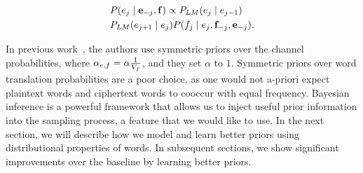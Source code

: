 
\begin{align} \label{prob_sampling_plaintext}
&P( e_j \mid \mathbf{e}_{-j}, \mathbf{f} ) \propto  P_{LM}(e_j \mid e_{j-1})  \\
&           P_{LM}(e_{j+1} \mid e_{j})   P(f_j \mid e_j,\mathbf{f}_{-j}, \mathbf{e}_{-j}).
\end{align}

\iffalse
%
\[
\label{p_sample}
P_{sample}(e_{1}e_{2}) =  P(e_{1}e_{2}) \prod_{i=1}^{2}P_{CRP}(f_{i}|e_{i})
\]
%
In the above equation, the translation probability $P_{CRP}(f_{i}|e_{i})$ is modeled by the Chinese Restaurant Process(CRP) as defined in Equation \ref{p_channel}.
\[
\label{p_channel}
P_{CRP}(f_{i}|e_{i}) = \frac{\alpha P_0(f_{i}|e_{i})+count(f_{i},e_{i})}{\alpha+count(e_{i})}
\]
%
where $P_{0}$ is a base distribution, also known as a prior, and $\alpha$ is a parameter that controls how much we trust the base distribution. $count(f_{i},e_{i})$ and $count(e_{i})$ record the number of times $f_{i},e_{i}$ and $e_{i}$ appear in previously generated samples respectively. The base distribution is given independently, and in all the previous work, it is set to uniform.
\fi

\iffalse
At the end of sampling, we compute $P(\cipher \mid \plain)$ from ciphertext and its plaintext samples using maximum likelihood estimation:

\[
\label{mlh_estimation}
P(\cipher \mid \plain) =  \frac{\#(\cipher,\plain)}{\#(\plain)}.
\]
\fi

In previous work~\cite{Dou:2012}, the authors use symmetric priors over the channel probabilities, where $\alpha_{e,f} = \alpha \frac{1}{V_{f}}$, and they set $\alpha$ to $1$. Symmetric priors over word translation probabilities are a poor choice, as one would not a-priori expect plaintext words and ciphertext words to cooccur with equal frequency. Bayesian inference is a powerful framework that allows us to inject useful prior information into the sampling process, a feature that we would like to use. In the next section, we will describe how we model and learn better priors using distributional properties of words. In subsequent sections, we show significant improvements over the baseline by learning better priors.


